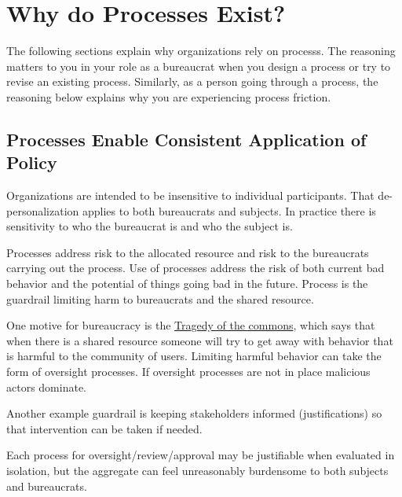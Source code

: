 \section{Why do Processes Exist?\label{sec:why-processes-exist}}


The following sections explain why organizations rely on \glspl{process}. The reasoning matters to you in your role as a bureaucrat when you design a process or try to revise an existing process. Similarly, as a person going through a process, the reasoning below explains why you are experiencing \gls{process friction}. 

\subsection*{Processes Enable Consistent Application of Policy}

Organizations are intended to be insensitive to individual participants. That de-personalization applies to both bureaucrats and subjects. In practice there is sensitivity to who the bureaucrat is and who the subject is. 

Processes address risk to the allocated resource and risk to the bureaucrats carrying out the process.
Use of processes address the risk of both current bad behavior and the potential of things going bad in the future. Process is the guardrail limiting harm to bureaucrats and the shared resource. 

One motive for bureaucracy is the \href{https://en.wikipedia.org/wiki/Tragedy_of_the_commons}{Tragedy of the commons}, 
which says that when there is a shared resource someone will try to get away with behavior that is harmful to the community of users. Limiting harmful behavior can take the form of oversight processes. If oversight processes are not in place malicious actors dominate.

Another example guardrail is keeping stakeholders informed (justifications) so that intervention can be taken if needed. 

Each process for oversight/review/approval may be justifiable when evaluated in isolation, but the aggregate can feel unreasonably burdensome to both subjects and bureaucrats.





